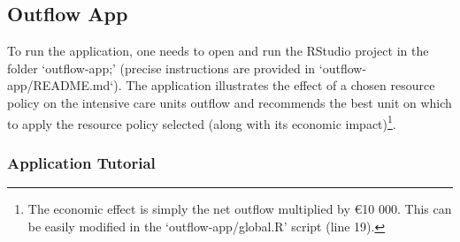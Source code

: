 \documentclass[12pt]{article}
\begin{document}
\subsection*{Outflow App}

To run the application, one needs to open and run the RStudio project in the folder `outflow-app;' (precise instructions are provided in `outflow-app/README.md`). The application illustrates the effect of a chosen resource policy on the intensive care units outflow and recommends the best unit on which to apply the resource policy selected (along with its economic impact)\footnote{The economic effect is simply the net outflow multiplied by \euro10 000. This can be easily modified in the `outflow-app/global.R' script (line 19). }. 

\subsubsection*{Application Tutorial}
\end{document}
